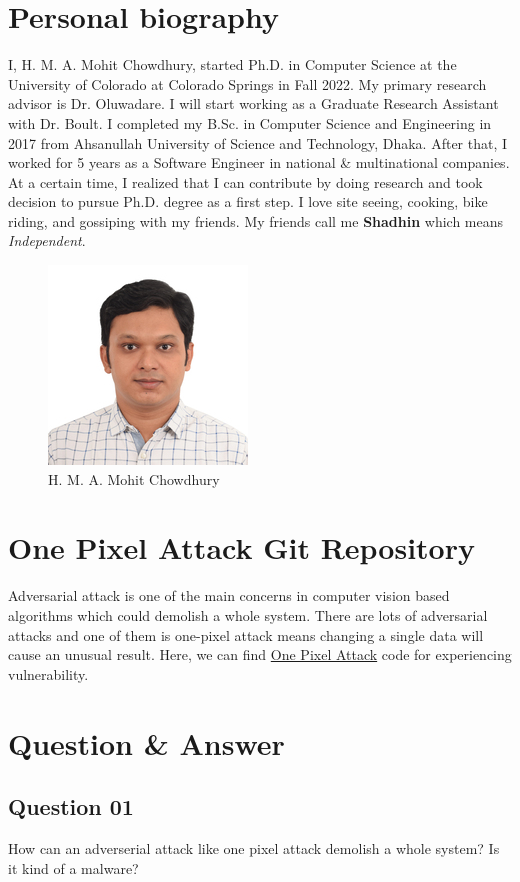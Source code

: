 \documentclass[11pt, letterpaper]{article}
\begin{document}
\section{Personal biography}
I, H. M. A. Mohit Chowdhury, started Ph.D. in Computer Science at the University of Colorado at Colorado Springs in Fall 2022. My primary research advisor is Dr. Oluwadare. I will start working as a Graduate Research Assistant with Dr. Boult. I completed my B.Sc. in Computer Science and Engineering in 2017 from Ahsanullah University of Science and Technology, Dhaka. After that, I worked for 5 years as a Software Engineer in national \& multinational companies. At a certain time, I realized that I can contribute by doing research and took decision to pursue Ph.D. degree as a first step. I love site seeing, cooking, bike riding, and gossiping with my friends. My friends call me \textbf{Shadhin} which means \textit{Independent}.

\begin{figure}[H] \center
    \includegraphics[scale=1]{chowdhury.jpg}
    \caption{H. M. A. Mohit Chowdhury}
    \label{fig:chowdhury}
\end{figure}

\section{One Pixel Attack Git Repository}
Adversarial attack is one of the main concerns in computer vision based algorithms which could demolish a whole system. There are lots of adversarial attacks and one of them is one-pixel attack means changing a single data will cause an unusual result. Here, we can find \href{https://github.com/Hyperparticle/one-pixel-attack-keras}{One Pixel Attack} code for experiencing vulnerability.

\section{Question \& Answer}
\subsection{Question 01} How can an adverserial attack like one pixel attack demolish a whole system? Is it kind of a malware? 
\end{document}
